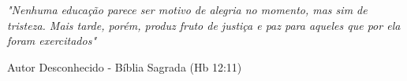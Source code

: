 %

\chapter*{}

\vspace{15cm}

\hfill\begin{minipage}{10cm}
\textit{"Nenhuma educação parece ser motivo de alegria no momento, mas sim de tristeza. Mais tarde, porém, produz fruto de justiça e paz para aqueles que por ela foram exercitados"}

\hfill{\small Autor Desconhecido - Bíblia Sagrada (Hb 12:11)}
\end{minipage}

%